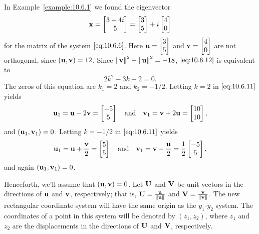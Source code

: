 \documentclass{ximera}
\begin{document}
\begin{example}\label{example:10.6.5}  
In Example~\ref{example:10.6.1}
we found the eigenvector
$$
{\bf x}=\begin{bmatrix}3+4i\\5\end{bmatrix}=\begin{bmatrix}3\\5\end{bmatrix}+i\begin{bmatrix}4\\0\end{bmatrix}
$$
for the matrix of the system $\eqref{eq:10.6.6}$. Here ${\bf u}=\begin{bmatrix}3\\5\end{bmatrix}$
and ${\bf v}=\begin{bmatrix}4\\0\end{bmatrix}$ are not orthogonal, since $({\bf u},{\bf
v})=12$. Since $\left\lVert{\bf v}\right\rVert^2-\left\lVert{\bf u}\right\rVert^2=-18$, $\eqref{eq:10.6.12}$ is
equivalent to
$$
2k^2-3k-2=0.
$$
The zeros of this equation are $k_1=2$ and $k_2=-1/2$. Letting $k=2$
in $\eqref{eq:10.6.11}$ yields
$$
{\bf u}_1={\bf u}-2{\bf v}=\begin{bmatrix}-5\\5\end{bmatrix}\quad\mbox{and}\quad
{\bf v}_1={\bf v}+2{\bf u}=\begin{bmatrix}10\\10\end{bmatrix},
$$
and $({\bf u}_1,{\bf v}_1)=0$.
 Letting $k=-1/2$
in $\eqref{eq:10.6.11}$ yields
$$
{\bf u}_1={\bf u}+\frac{{\bf v}}{2}=\begin{bmatrix}5\\5\end{bmatrix}\quad\mbox{and}\quad
{\bf v}_1={\bf v}-\frac{{\bf u}}{2}=\frac{1}{2}\begin{bmatrix}-5\\5\end{bmatrix},
$$
and again $({\bf u}_1,{\bf v}_1)=0$.
\end{example}


Henceforth, we'll assume that $({\bf u},{\bf v})=0$. Let ${\bf U}$ and
${\bf V}$ be unit vectors in the directions of ${\bf u}$ and ${\bf v}$, respectively; that is, ${\bf U}=\frac{{\bf u}}{\left\lVert{\bf u}\right\rVert}$ and ${\bf
V}=\frac{{\bf v}}{\left\lVert{\bf v}\right\rVert}$. The new rectangular coordinate system will
have the same origin as the $y_1$-$y_2$ system. The coordinates of a
point in this system will be denoted by $(z_1,z_2)$, where $z_1$ and
$z_2$ are the displacements in the directions of ${\bf U}$ and ${\bf
V}$, respectively.
\end{document}
